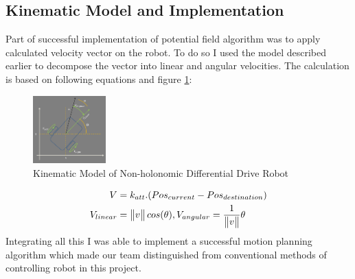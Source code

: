 \documentclass[conference,12pt]{IEEEtran}
\begin{document}
\subsection{Kinematic Model and Implementation}
Part of successful implementation of potential field algorithm was to apply calculated velocity vector on the robot. To do so I used the model described earlier to decompose the vector into linear and angular velocities. The calculation is based on following equations and figure \ref{fig:KinModel}:
\begin{figure}[htp]
\begin{center}
\leavevmode
\includegraphics[width=0.25\textwidth] {KinModel.png}
\end{center}
\caption{Kinematic Model of Non-holonomic Differential Drive Robot}
\label{fig:KinModel}
\end{figure}

\begin{align}
V & =k_{att}.(Pos_{current}-Pos_{destination})\\
V_{linear} &= \begin{Vmatrix}v\end{Vmatrix} cos(\theta) ,
V_{angular} = {1 \over \begin{Vmatrix}v\end{Vmatrix}} \theta
\end{align}
Integrating all this I was able to implement a successful motion planning algorithm which made our team distinguished from conventional methods of controlling robot in this project.
\end{document}

